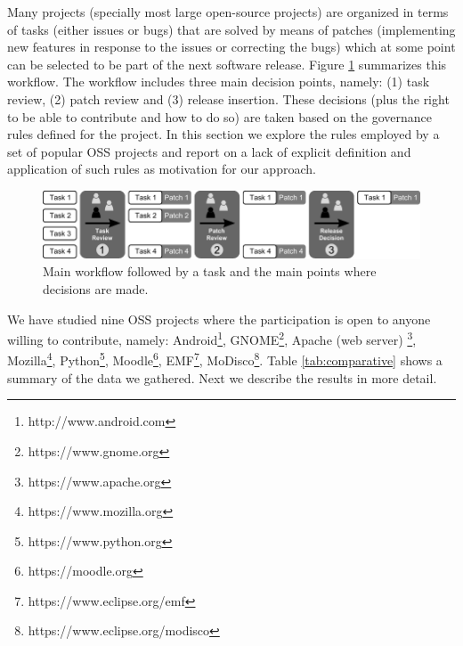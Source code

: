 Many projects (specially most large open-source projects) are organized in terms of tasks (either issues or bugs) that are solved by means of patches (implementing new features in response to the issues or correcting the bugs) which at some point can be selected to be part of the next software release. Figure \ref{fig:generalView} summarizes this workflow. The workflow includes three main decision points, namely: (1) task review, (2) patch review and (3) release insertion. These decisions (plus the right to be able to contribute and how to do so) are taken based on the governance rules defined for the project. In this section we explore the rules employed by a set of popular OSS projects and report on a lack of explicit definition and application of such rules as motivation for our approach. 

\begin{figure}[t] 
  \centering
  \includegraphics[width=\textwidth]{./figures/generalView}
  \caption{Main workflow followed by a task and the main points where decisions are made.}
  \label{fig:generalView}
\end{figure}

We have studied nine OSS projects where the participation is open to anyone willing to contribute, namely: Android\footnote{http://www.android.com}, GNOME\footnote{https://www.gnome.org}, 
Apache (web server) \footnote{https://www.apache.org}, Mozilla\footnote{https://www.mozilla.org}, Python\footnote{https://www.python.org}, Moodle\footnote{https://moodle.org}, EMF\footnote{https://www.eclipse.org/emf}, MoDisco\footnote{https://www.eclipse.org/modisco}. Table \ref{tab:comparative} shows a summary of the data we gathered. Next we describe the results in more detail.


